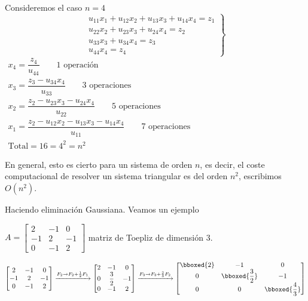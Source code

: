 Consideremos el caso $n=4$\[ \left.\begin{array}{r}
	u_{11}x_1+u_{12}x_2+u_{13}x_3+u_{14}x_4=z_1\\
	u_{22}x_2+u_{23}x_3+u_{24}x_4=z_2\\
	u_{33}x_3+u_{34}x_4=z_3\\
	u_{44}x_4=z_4
\end{array}\right\} \]$\begin{array}{l}
	x_4=\dfrac{z_4}{u_{44}}\qquad\text{1 operación}\\
	x_3=\dfrac{z_3-u_{34}x_4}{u_{33}}\qquad\text{3 operaciones}\\
	x_2=\dfrac{z_2-u_{23}x_3-u_{24}x_4}{u_{22}}\qquad\text{5 operaciones}\\
	x_1=\dfrac{z_2-u_{12}x_2-u_{13}x_3-u_{14}x_4}{u_{11}}\qquad\text{7
		operaciones}\\
	\text{Total} = 16=4^2=n^2
\end{array}$

En general, esto es cierto para un sistema de orden $n$, es decir, el coste
computacional de resolver un sistema triangular es del orden $n^2$, escribimos
$O(n^2)$.


Haciendo eliminación Gaussiana. Veamos un ejemplo \begin{center}
	$A=\begin{bmatrix}
		2 & -1 & 0 \\
		-1 & 2 & -1 \\
		0 & -1 & 2
	\end{bmatrix}$ matriz de Toepliz de dimensión 3.
\end{center}
$\begin{bmatrix}
	2 & -1 & 0 \\
	-1 & 2 & -1 \\
	0 & -1 & 2
\end{bmatrix}\xrightarrow{F_2\to F_2+\frac{1}{2}F_1}\begin{bmatrix}
	2 & -1 & 0 \\ 
	0 & \dfrac{3}{2} & -1 \\ 
	0 & -1 & 2
\end{bmatrix}\xrightarrow{F_3\to F_3+\frac{2}{3}F_2}\begin{bmatrix}
	\bboxed{2} & -1 & 0 \\ 
	0 & \bboxed{\dfrac{3}{2}} & -1 \\ 
	0 & 0 & \bboxed{\dfrac{4}{3}}
\end{bmatrix} $

